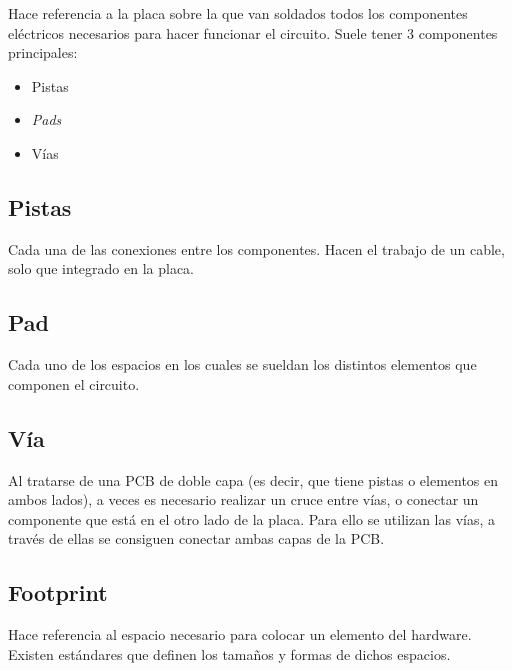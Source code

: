 Hace referencia a la placa sobre la que van soldados todos los componentes eléctricos necesarios para hacer funcionar el circuito. Suele tener 3 componentes principales:

\begin{itemize}
\item
Pistas
\item
\emph{Pads}
\item
Vías
\end{itemize}
\newpage
\subsection{Pistas}\label{pistas}

Cada una de las conexiones entre los componentes. Hacen el trabajo de un cable, solo que integrado en la placa.


\subsection{Pad}\label{pad}

Cada uno de los espacios en los cuales se sueldan los distintos  elementos que componen el circuito.


\subsection{Vía}\label{via}

Al tratarse de una PCB de doble capa (es decir, que tiene pistas o elementos en ambos lados), a veces es necesario realizar un cruce entre vías, o conectar un componente que está en el otro lado de la placa. Para ello se utilizan las vías, a través de ellas se consiguen conectar ambas capas de la PCB.


\subsection{Footprint}\label{footprint}

Hace referencia al espacio necesario para colocar un elemento del hardware. Existen estándares que definen los tamaños y formas de dichos espacios.


